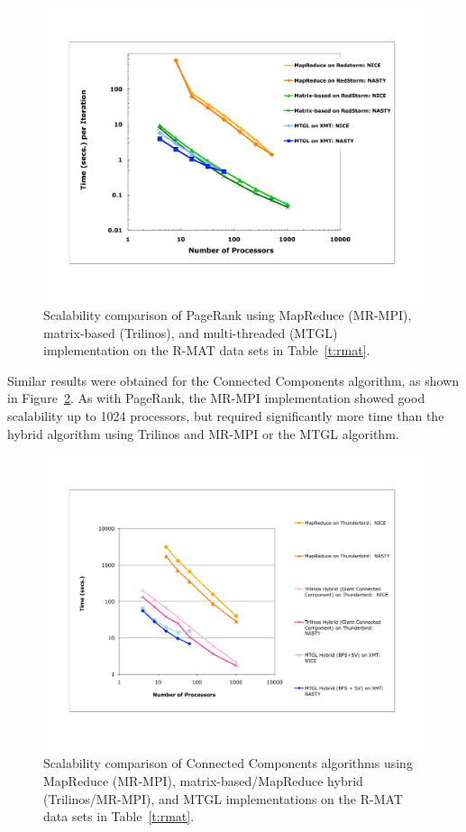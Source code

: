 \begin{figure}[htb]
\includegraphics[width=\textwidth]{fig_pagerank_big.pdf}
\caption{Scalability comparison of PageRank using MapReduce (MR-MPI),
matrix-based (Trilinos), and multi-threaded (MTGL) implementation on
the R-MAT data sets in Table~\ref{t:rmat}.}
\label{f:prbig}
\end{figure}

Similar results were obtained for the Connected Components algorithm,
as shown in Figure~\ref{f:ccbig}.  As with PageRank, the MR-MPI
implementation showed good scalability up to 1024 processors, but
required significantly more time than the hybrid algorithm using
Trilinos and MR-MPI or the MTGL algorithm.

\begin{figure}[htb]
\includegraphics[width=\textwidth]{fig_cc_big.pdf}
\caption{Scalability comparison of Connected Components algorithms using 
MapReduce (MR-MPI),
matrix-based/MapReduce hybrid (Trilinos/MR-MPI), and MTGL implementations
on the R-MAT data sets in Table~\ref{t:rmat}.}
\label{f:ccbig}
\end{figure}

